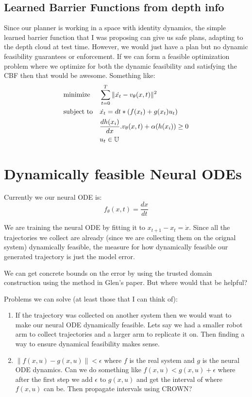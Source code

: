\documentclass[12pt]{article}
\begin{document}
\subsection{Learned Barrier Functions from depth info}
Since our planner is working in a space with identity dynamics, the simple learned barrier function that I was proposing can give us safe plans, adapting to the depth cloud at test time. However, we would just have a plan but no dynamic feasibility guarantees or enforcement. If we can form a feasible optimization problem where we optimize for both the dynamic feasibility and satisfying the CBF then that would be awesome. 
Something like:
\[
\begin{aligned}
    &\text{minimize} && \sum_{t=0}^{T} \|\dot{x_{t}} - v_{\theta}(x,t)\|^2 \notag \\
    &\text{subject to} && \dot{x_{t}} = dt * (f(x_{t}) + g(x_{t})u_{t}) \notag \\
    &&& \frac{dh(x_{i})}{dx}.v_{\theta}(x,t) + \alpha(h(x_{i})) \geq 0 \notag \\
    &&& u_{t} \in \mathbb{U} \notag \\
\end{aligned}
\]

\section{Dynamically feasible Neural ODEs}
Currently we our neural ODE is: \[f_\theta(x, t) = \frac{dx}{dt}\]

We are training the neural ODE by fitting it to \(x_{t+1} - x_{t} = \dot{x}\). Since all the trajectories we collect are already  (since we are collecting them on the orignal system) dynamically feasible, the measure for how dynamically feasible our generated trajectory is just the model error. 

We can get concrete bounds on the error by using the trusted domain construction using the method in Glen's paper. But where would that be helpful?

Problems we can solve (at least those that I can think of):
\begin{enumerate}
    \item If the trajectory was collected on another system then we would want to make our neural ODE dynamically feasible. Lets say we had a smaller robot arm to collect trajectories and a larger arm to replicate it on. Then finding a way to ensure dynamical feasibility makes sense. 
    \item \(\|f(x,u) - g(x,u)\| < \epsilon\) where \(f\) is the real system and \(g\) is the neural ODE dynamics. Can we do something like \(f(x,u) < g(x,u) + \epsilon\) where after the first step we add \(\epsilon\) to \(g(x,u)\) and get the interval of where \(f(x,u)\) can be. Then propagate intervals using CROWN?
\end{enumerate}
\end{document}
